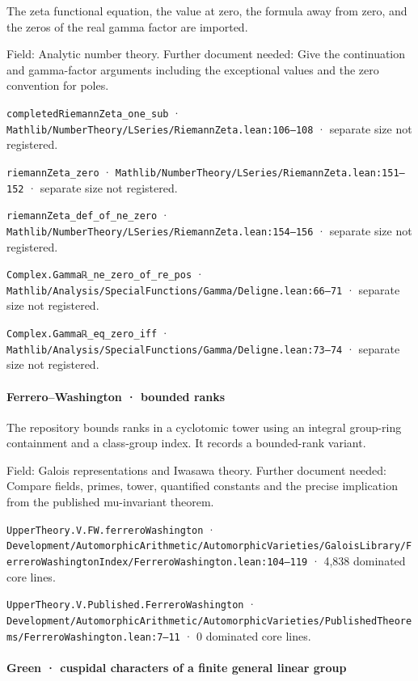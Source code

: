 The zeta functional equation, the value at zero, the formula away from zero, and the zeros of the real gamma factor are imported.

Field: Analytic number theory. Further document needed: Give the continuation and gamma-factor arguments including the exceptional values and the zero convention for poles.

\nolinkurl{completedRiemannZeta_one_sub} · \nolinkurl{Mathlib/NumberTheory/LSeries/RiemannZeta.lean:106–108} · separate size not registered.

\nolinkurl{riemannZeta_zero} · \nolinkurl{Mathlib/NumberTheory/LSeries/RiemannZeta.lean:151–152} · separate size not registered.

\nolinkurl{riemannZeta_def_of_ne_zero} · \nolinkurl{Mathlib/NumberTheory/LSeries/RiemannZeta.lean:154–156} · separate size not registered.

\nolinkurl{Complex.Gammaℝ_ne_zero_of_re_pos} · \nolinkurl{Mathlib/Analysis/SpecialFunctions/Gamma/Deligne.lean:66–71} · separate size not registered.

\nolinkurl{Complex.Gammaℝ_eq_zero_iff} · \nolinkurl{Mathlib/Analysis/SpecialFunctions/Gamma/Deligne.lean:73–74} · separate size not registered.

\paragraph{Ferrero–Washington · bounded ranks}

The repository bounds ranks in a cyclotomic tower using an integral group-ring containment and a class-group index. It records a bounded-rank variant.

Field: Galois representations and Iwasawa theory. Further document needed: Compare fields, primes, tower, quantified constants and the precise implication from the published mu-invariant theorem.

\nolinkurl{UpperTheory.V.FW.ferreroWashington} · \nolinkurl{Development/AutomorphicArithmetic/AutomorphicVarieties/GaloisLibrary/FerreroWashingtonIndex/FerreroWashington.lean:104–119} · 4,838 dominated core lines.

\nolinkurl{UpperTheory.V.Published.FerreroWashington} · \nolinkurl{Development/AutomorphicArithmetic/AutomorphicVarieties/PublishedTheorems/FerreroWashington.lean:7–11} · 0 dominated core lines.

\paragraph{Green · cuspidal characters of a finite general linear group}

